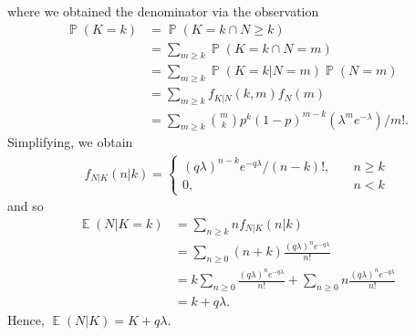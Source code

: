 \documentclass[12pt]{amsbook}
\DeclareMathOperator{\ex}{\mathbb{E}}
\DeclareMathOperator{\prob}{\mathbb{P}}
\theoremstyle{plain}
\theoremstyle{definition}
\theoremstyle{remark}
\numberwithin{equation}{section}  %
\begin{document}
	where we obtained the denominator via the observation
	\begin{align*}
		\prob(K = k) & = \prob(K = k \cap N \ge k) 
		\\
		& = \sum_{m \ge k} \prob(K =
		k \cap N = m) 
		\\
		& = \sum_{m \ge k} \prob(K = k | N = m) \prob(N = m)
		\\
		& = \sum_{m \ge k} f_{K|N}(k, m) f_N(m)
		\\
		& = \sum_{m \ge k}
		\binom{m}{k} p^k {(1 - p)}^{m-k} (\lambda^m e^{-\lambda})/m!.
	\end{align*}
	Simplifying, we obtain
	\begin{align*}
		f_{N|K}(n|k) = 
		\begin{cases}
			{(q\lambda)}^{n-k} e^{-q\lambda}/(n-k)!, \quad & n \ge k
			\\
			0, \quad & n<k
		\end{cases}
	\end{align*}
	and so 
	\begin{align*}
		\ex(N | K = k) & = \sum_{n \ge k} n f_{N|K}(n | k)
		\\
		& = \sum_{n \ge 0} (n + k) \frac{{(q \lambda)}^n e^{-q\lambda}}{n!}
		\\
		& = k \sum_{n \ge 0} \frac{{(q \lambda)}^n e^{-q\lambda}}{n!} + \sum_{n \ge 
		0}
		n \frac{{(q\lambda)}^n e^{-q\lambda}}{n!} 
		\\
		& = k + q\lambda.
	\end{align*}
	Hence, $\ex(N|K) = K + q \lambda$.
\end{document}

